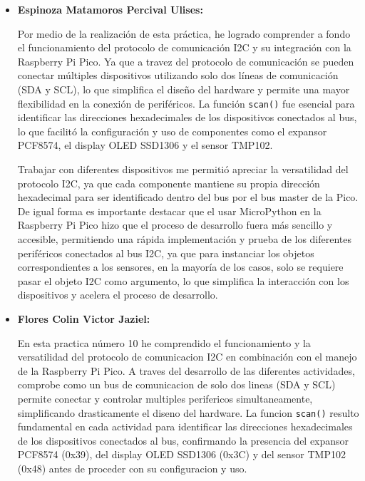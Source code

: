 \documentclass[letterpaper,12pt]{article}
\begin{document}
    \begin{itemize}
        \item \textbf{Espinoza Matamoros Percival Ulises:} 
        
        Por medio de la realización de esta práctica, he logrado comprender a fondo el funcionamiento del protocolo de comunicación I2C y su integración con la Raspberry Pi Pico. Ya que a travez del protocolo de comunicación se pueden conectar múltiples dispositivos utilizando solo dos líneas de comunicación (SDA y SCL), lo que simplifica el diseño del hardware y permite una mayor flexibilidad en la conexión de periféricos. La función \texttt{scan()} fue esencial para identificar las direcciones hexadecimales de los dispositivos conectados al bus, lo que facilitó la configuración y uso de componentes como el expansor PCF8574, el display OLED SSD1306 y el sensor TMP102. 

        Trabajar con diferentes dispositivos me permitió apreciar la versatilidad del protocolo I2C, ya que cada componente mantiene su propia dirección hexadecimal para ser identificado dentro del bus por el bus master de la Pico. De igual forma es importante destacar que el usar MicroPython en la Raspberry Pi Pico hizo que el proceso de desarrollo fuera más sencillo y accesible, permitiendo una rápida implementación y prueba de los diferentes periféricos conectados al bus I2C, ya que para instanciar los objetos correspondientes a los sensores, en la mayoría de los casos, solo se requiere pasar el objeto I2C como argumento, lo que simplifica la interacción con los dispositivos y acelera el proceso de desarrollo.

        \item \textbf{Flores Colin Victor Jaziel:} 
        
        En esta practica número 10 he comprendido el funcionamiento y la versatilidad del protocolo de comunicacion I2C en combinación con el manejo de la Raspberry Pi Pico. A traves del desarrollo de las diferentes actividades, comprobe como un bus de comunicacion de solo dos lineas (SDA y SCL) permite conectar y controlar multiples perifericos simultaneamente, simplificando drasticamente el diseno del hardware. La funcion \texttt{scan()} resulto fundamental en cada actividad para identificar las direcciones hexadecimales de los dispositivos conectados al bus, confirmando la presencia del expansor PCF8574 (0x39), del display OLED SSD1306 (0x3C) y del sensor TMP102 (0x48) antes de proceder con su configuracion y uso.


\end{itemize}
\end{document}
